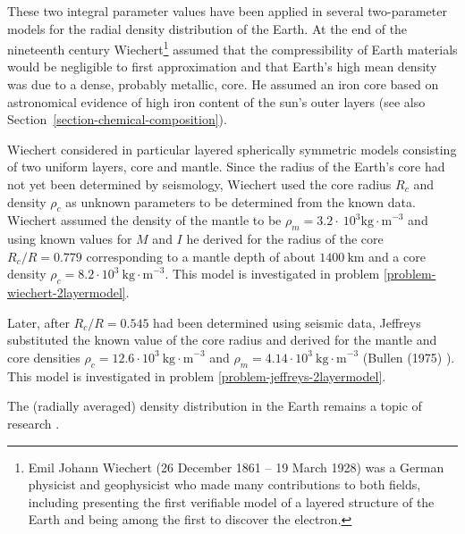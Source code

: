 These two integral parameter values have been applied in several 
two-parameter models for the radial density distribution of the Earth.
At the end of the nineteenth century Wiechert\footnote{Emil Johann 
Wiechert (26 December 1861 – 19 March 1928) was a German physicist 
and geophysicist who made many contributions to both fields, 
including presenting the first verifiable model of a layered structure of the 
Earth and being among the first to discover the electron.} assumed that the 
compressibility of Earth materials would be negligible to first
approximation and that Earth's high mean density was due to a dense,
probably metallic, core.
He assumed an iron core based on astronomical evidence of high iron
content of the sun's outer layers 
(see also Section~\ref{section-chemical-composition}).

Wiechert considered in particular layered spherically symmetric 
models consisting of two uniform layers, core and mantle.
Since the radius of the Earth's core had not yet been determined by
seismology, Wiechert used the core radius $R_c$ and density 
$\rho_c$ as unknown parameters to be determined from the
known data.
Wiechert assumed the density of the mantle to be 
$\rho_m=3.2 \cdot~10^3 \mathrm{kg\cdot m}^{-3}$ and using known values for $M$ and $I$
he derived for the radius of the core
$R_c/R = 0.779$ corresponding to a mantle depth of about
$1400~\mathrm{km}$ and a core density 
$\rho_c=8.2\cdot 10^3~\mathrm{kg\cdot m}^{-3}$.
This model is investigated in problem 
\ref{problem-wiechert-2layermodel}.

Later, after $R_c/R = 0.545$ had been determined using
seismic data, Jeffreys substituted the known value of the
core radius and derived for the mantle and core densities
$\rho_c=12.6\cdot 10^3~ \mathrm{kg\cdot m}^{-3}$ and 
$\rho_m=4.14\cdot 10^3~ \mathrm{kg\cdot m}^{-3}$ (Bullen (1975) \cite{bull75}).
This model is investigated in problem 
\ref{problem-jeffreys-2layermodel}.

The (radially averaged) density distribution in the Earth remains a topic of research
\cite{kenn98}.
